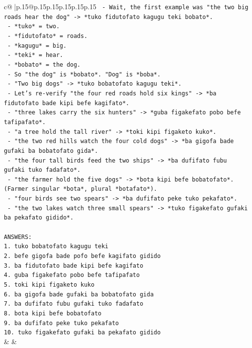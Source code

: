 \documentclass{article}
\begin{document}
{\begin{supertabular}{c@{$\;$}|p{.15\linewidth}@{}p{.15\linewidth}p{.15\linewidth}p{.15\linewidth}p{.15\linewidth}p{.15\linewidth}}
{{{\texttt{      {-} Wait, the first example was "the two big roads hear the dog" {-}> *tuko fidutofato kagugu teki bobato*.} \\
\texttt{        {-} *tuko* = two.} \\
\texttt{        {-} *fidutofato* = roads.} \\
\texttt{        {-} *kagugu* = big.} \\
\texttt{        {-} *teki* = hear.} \\
\texttt{        {-} *bobato* = the dog.} \\
\texttt{        {-} So "the dog" is *bobato*. "Dog" is *boba*.} \\
\texttt{        {-} "Two big dogs" {-}> *tuko bobatofato kagugu teki*.} \\
\texttt{      {-} Let's re{-}verify "the four red roads hold six kings" {-}> *ba fidutofato bade kipi befe kagifato*.} \\
\texttt{      {-} "three lakes carry the six hunters" {-}> *guba figakefato pobo befe tafipafato*.} \\
\texttt{      {-} "a tree hold the tall river" {-}> *toki kipi figaketo kuko*.} \\
\texttt{      {-} "the two red hills watch the four cold dogs" {-}> *ba gigofa bade gufaki ba bobatofato gida*.} \\
\texttt{      {-} "the four tall birds feed the two ships" {-}> *ba dufifato fubu gufaki tuko fadafato*.} \\
\texttt{      {-} "the farmer hold the five dogs" {-}> *bota kipi befe bobatofato*. (Farmer singular *bota*, plural *botafato*).} \\
\texttt{      {-} "four birds see two spears" {-}> *ba dufifato peke tuko pekafato*.} \\
\texttt{      {-} "the two lakes watch three small spears" {-}> *tuko figakefato gufaki ba pekafato gidido*.} \\
\\ 
\texttt{ANSWERS:} \\
\texttt{1. tuko bobatofato kagugu teki} \\
\texttt{2. befe gigofa bade pofo befe kagifato gidido} \\
\texttt{3. ba fidutofato bade kipi befe kagifato} \\
\texttt{4. guba figakefato pobo befe tafipafato} \\
\texttt{5. toki kipi figaketo kuko} \\
\texttt{6. ba gigofa bade gufaki ba bobatofato gida} \\
\texttt{7. ba dufifato fubu gufaki tuko fadafato} \\
\texttt{8. bota kipi befe bobatofato} \\
\texttt{9. ba dufifato peke tuko pekafato} \\
\texttt{10. tuko figakefato gufaki ba pekafato gidido} \\
            }
        }
    }
    & & \\ \\


\end{supertabular}}
\end{document}
